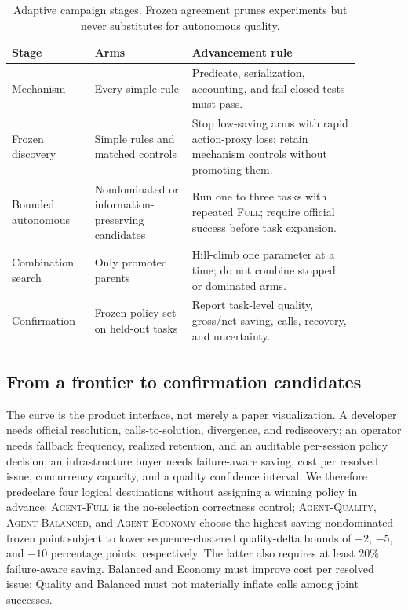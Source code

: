 \documentclass[11pt]{article}
\begin{document}
\begin{table}[H]
\centering
\small
\caption{Adaptive campaign stages. Frozen agreement prunes experiments but
never substitutes for autonomous quality.}
\begin{tabular}{>{\raggedright\arraybackslash}p{0.20\linewidth}
                >{\raggedright\arraybackslash}p{0.25\linewidth}
                >{\raggedright\arraybackslash}p{0.43\linewidth}}
\toprule
Stage & Arms & Advancement rule \\
\midrule
Mechanism & Every simple rule & Predicate, serialization, accounting, and
fail-closed tests must pass. \\
Frozen discovery & Simple rules and matched controls & Stop low-saving arms
with rapid action-proxy loss; retain mechanism controls without promoting them. \\
Bounded autonomous & Nondominated or information-preserving candidates & Run
one to three tasks with repeated \textsc{Full}; require official success before
task expansion. \\
Combination search & Only promoted parents & Hill-climb one parameter at a
time; do not combine stopped or dominated arms. \\
Confirmation & Frozen policy set on held-out tasks & Report task-level quality,
gross/net saving, calls, recovery, and uncertainty. \\
\bottomrule
\end{tabular}
\end{table}

\subsection{From a frontier to confirmation candidates}

The curve is the product interface, not merely a paper visualization.  A
developer needs official resolution, calls-to-solution, divergence, and
rediscovery; an operator needs fallback frequency, realized retention, and an
auditable per-session policy decision; an infrastructure buyer needs
failure-aware saving, cost per resolved issue, concurrency capacity, and a
quality confidence interval.  We therefore predeclare four logical destinations
without assigning a winning policy in advance: \textsc{Agent-Full} is the
no-selection correctness control; \textsc{Agent-Quality},
\textsc{Agent-Balanced}, and \textsc{Agent-Economy} choose the highest-saving
nondominated frozen point subject to lower sequence-clustered quality-delta
bounds of $-2$, $-5$, and $-10$ percentage points, respectively.  The latter
also requires at least 20\% failure-aware saving.  Balanced and Economy must
improve cost per resolved issue; Quality and Balanced must not materially
inflate calls among joint successes.
\end{document}
